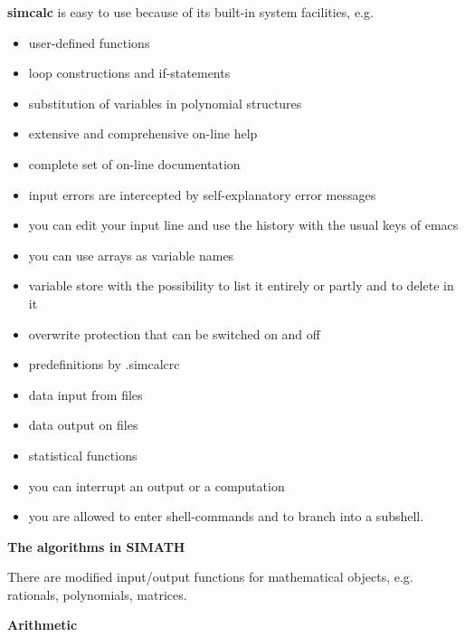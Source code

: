 \noindent
{\bf simcalc} is easy to use because of its
built-in system facilities, e.g.
\begin{itemize}
\item user-defined functions
\item loop constructions and if-statements
\item substitution of variables in polynomial structures
\item extensive and comprehensive on-line help
\item complete set of on-line documentation
\item input errors are intercepted by self-explanatory error messages
\item you can edit your input line and use the history with the 
usual keys of emacs
\item you can use arrays as variable names
\item variable store with the possibility to list it entirely or partly
and to delete in it
\item overwrite protection that can be switched on and off
\item predefinitions by .simcalcrc
\item data input from files
\item data output on files
\item statistical functions
\item you can interrupt an output or a computation
\item you are allowed to enter shell-commands and to branch into a 
subshell.
\end{itemize}
\newpage


\begin{center}
{\Large {\bf The algorithms in SIMATH}}
\end{center}

\vspace{0.3cm}

\noindent
There are modified input/output functions for mathematical objects,
e.g. rationals, polynomials, matrices.

\vspace{0.4cm}

\begin{center}
{\large {\bf Arithmetic}}
\end{center}

